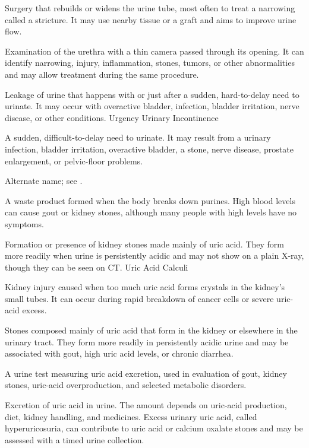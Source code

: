  Surgery that rebuilds or widens the urine tube, most often to treat a narrowing called a stricture. It may use nearby tissue or a graft and aims to improve urine flow.

 Examination of the urethra with a thin camera passed through its opening. It can identify narrowing, injury, inflammation, stones, tumors, or other abnormalities and may allow treatment during the same procedure.

 Leakage of urine that happens with or just after a sudden, hard-to-delay need to urinate. It may occur with overactive bladder, infection, bladder irritation, nerve disease, or other conditions.
\synonyms
Urgency Urinary Incontinence

 A sudden, difficult-to-delay need to urinate. It may result from a urinary infection, bladder irritation, overactive bladder, a stone, nerve disease, prostate enlargement, or pelvic-floor problems.

 Alternate name; see .

 A waste product formed when the body breaks down purines. High blood levels can cause gout or kidney stones, although many people with high levels have no symptoms.

 Formation or presence of kidney stones made mainly of uric acid. They form more readily when urine is persistently acidic and may not show on a plain X-ray, though they can be seen on CT.
\synonyms
Uric Acid Calculi

 Kidney injury caused when too much uric acid forms crystals in the kidney’s small tubes. It can occur during rapid breakdown of cancer cells or severe uric-acid excess.

 Stones composed mainly of uric acid that form in the kidney or elsewhere in the urinary tract. They form more readily in persistently acidic urine and may be associated with gout, high uric acid levels, or chronic diarrhea.

 A urine test measuring uric acid excretion, used in evaluation of gout, kidney stones, uric-acid overproduction, and selected metabolic disorders.

 Excretion of uric acid in urine. The amount depends on uric-acid
production, diet, kidney handling, and medicines. Excess urinary uric acid, called
hyperuricosuria, can contribute to uric acid or calcium oxalate stones and may be assessed
with a timed urine collection.

